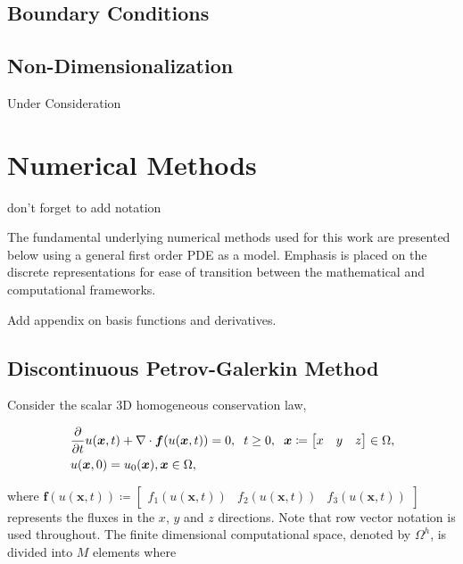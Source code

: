 \documentclass[12pt,Bold,letterpaper,TexShade]{mcgilletdclass}
\numberwithin{equation}{section}
\newcommand{\vect}[1]{\bm{{#1}}}
\begin{document}
\section{Boundary Conditions}

\section{Non-Dimensionalization}
{\color{red}Under Consideration}



\chapter{Numerical Methods}
{\color{red} don't forget to add notation}

The fundamental underlying numerical methods used for this work are presented below using a general first order PDE as a model. Emphasis is placed on the discrete representations for ease of transition between the mathematical and computational frameworks.

{\color{red} Add appendix on basis functions and derivatives.}

\section{Discontinuous Petrov-Galerkin Method}

Consider the scalar 3D homogeneous conservation law,

\begin{align*}
& \frac{\partial}{\partial t} u(\vect{x},t) + \nabla \cdot \vect{f}(u(\vect{x},t)) = 0,
\hspace{2mm} t \ge 0, \hspace{2mm}
\vect{x} \coloneqq \begin{bmatrix} x & y & z \end{bmatrix} \in \Omega, \\
& u(\vect{x},0) = u_0(\vect{x}), \vect{x} \in \Omega,
\end{align*}

where $\vect{f}(u(\vect{x},t)) \coloneqq \begin{bmatrix} f_1(u(\vect{x},t)) & f_2(u(\vect{x},t)) & f_3(u(\vect{x},t)) \end{bmatrix} $ represents the fluxes in the $x$, $y$ and $z$ directions. Note that row vector notation is used throughout. The finite dimensional computational space, denoted by $\Omega^h$, is divided into $M$ elements where
\end{document}
